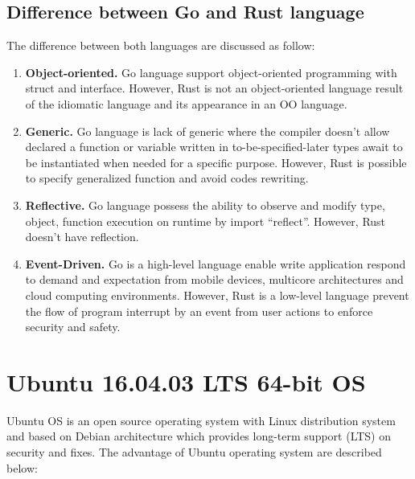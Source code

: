 \subsection{Difference between Go and Rust language}

The difference between both languages are discussed as follow: 

\begin{enumerate}[topsep=0pt,itemsep=-1ex,partopsep=1ex,parsep=1.5ex]
	
	\item \textbf{Object-oriented.} Go language support object-oriented programming with struct and interface. However, Rust is not an object-oriented language result of the idiomatic language and its appearance in an OO language. \cite{rust-not-oop}
	\item \textbf{Generic. } Go language is lack of generic where the compiler doesn’t allow declared a function or variable written in to-be-specified-later types await to be instantiated when needed for a specific purpose. However, Rust is possible to specify generalized function and avoid codes rewriting.
	\item \textbf{Reflective.} Go language possess the ability to observe and modify type, object, function execution on runtime by import “reflect”. However, Rust doesn’t have reflection.
	\item \textbf{Event-Driven. } Go is a high-level language enable write application respond to demand and expectation from mobile devices, multicore architectures and cloud computing environments. However,  Rust is a low-level language prevent the flow of program interrupt by an event from user actions to enforce security and safety. 
	
\end{enumerate}

\pagebreak

\section{Ubuntu 16.04.03 LTS 64-bit OS }

Ubuntu OS is an open source operating system with Linux distribution system and based on Debian architecture which provides long-term support (LTS) on security and fixes. \cite{difference-unix} The advantage of Ubuntu operating system are described below:

